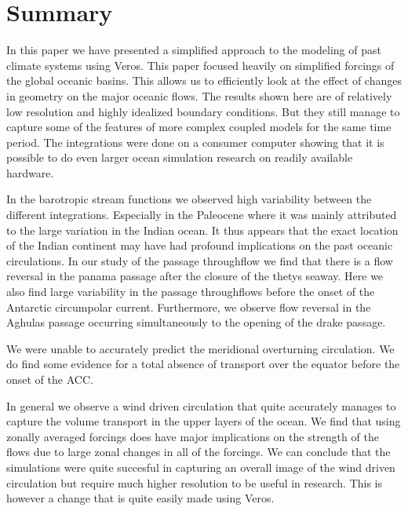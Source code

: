 \section{Summary}
In this paper we have presented a simplified approach to the modeling of past climate systems using Veros. This paper focused heavily on simplified forcings of the global oceanic basins. This allows us  to efficiently look at the effect of changes in geometry on the major oceanic flows. The results shown here are of relatively low resolution and highly idealized boundary conditions. But they still manage to capture some of the features of more complex coupled models for the same time period. The integrations were done on a consumer computer showing that it is possible to do even larger ocean simulation research on readily available hardware.

In the barotropic stream functions we observed high variability between the different integrations. Especially in the Paleocene where it was mainly attributed to the large variation in the Indian ocean. It thus appears that the exact location of the Indian continent may have had profound implications on the past oceanic circulations. In our study of the passage throughflow we find that there is a flow reversal in the panama passage after the closure of the thetys seaway. Here we also find large variability in the passage throughflows before the onset of the Antarctic circumpolar current. Furthermore, we observe flow reversal in the Aghulas passage occurring simultaneously to the opening of the drake passage. 

We were unable to accurately predict the meridional overturning circulation. We do find some evidence for a total absence of transport over the equator before the onset of the ACC.

In general we observe a wind driven circulation that quite accurately manages to capture the volume transport in the upper layers of the ocean. We find that using zonally averaged forcings does have major implications on the strength of the flows due to large zonal changes in all of the forcings. We can conclude that the simulations were quite succesful in capturing an overall image of the wind driven circulation but require much higher resolution to be useful in research. This is however a change that is quite easily made using Veros. 


